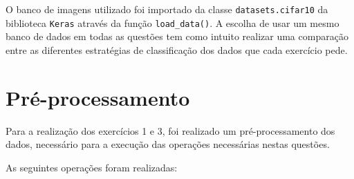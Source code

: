 \documentclass[]{abntex2}
\begin{document}
O banco de imagens utilizado foi importado da classe \texttt{datasets.cifar10} da biblioteca \texttt{Keras} através da função \texttt{load\_data()}. A escolha de usar um mesmo banco de dados em todas as questões tem como intuito realizar uma comparação entre as diferentes estratégias de classificação dos dados que cada exercício pede.



\section*{\textbf{Pré-processamento}}

Para a realização dos exercícios 1 e 3, foi realizado um pré-processamento dos dados, necessário para a execução das operações necessárias nestas questões.

As seguintes operações foram realizadas:
\end{document}
